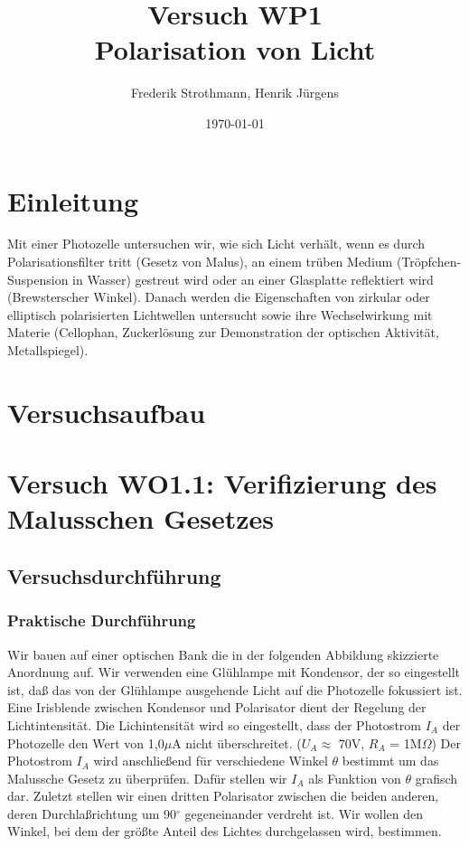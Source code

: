 \documentclass[12pt]{scrartcl}
\title{Versuch WP1\\ Polarisation von Licht}
\author{Frederik Strothmann, Henrik Jürgens}
\date{\today}
\begin{document}

\maketitle
\tableofcontents
\newpage


\section{Einleitung}
Mit einer Photozelle untersuchen wir, wie sich Licht verhält, wenn es durch Polarisationsfilter tritt (Gesetz von Malus), an einem trüben Medium (Tröpfchen-Suspension in Wasser) gestreut wird oder an einer Glasplatte reflektiert wird (Brewsterscher Winkel).
Danach werden die Eigenschaften von zirkular oder elliptisch polarisierten Lichtwellen untersucht sowie ihre Wechselwirkung mit Materie (Cellophan, Zuckerlösung zur Demonstration der optischen Aktivität, Metallspiegel). 


\section{Versuchsaufbau}

\section{Versuch WO1.1: Verifizierung des Malusschen Gesetzes}
\subsection{Versuchsdurchführung}
\subsubsection{Praktische Durchführung}
Wir bauen auf einer optischen Bank die in 
der folgenden Abbildung skizzierte Anordnung auf.
Wir verwenden eine Glühlampe mit Kondensor, der so eingestellt ist, daß das von der Glühlampe ausgehende Licht auf die Photozelle fokussiert ist. Eine Irisblende zwischen Kondensor und Polarisator dient der Regelung der Lichtintensität. Die
Lichintensität wird so eingestellt, dass der Photostrom $I_A$ der Photozelle 
den Wert von 1,0$\mu$A nicht überschreitet. ($U_A \approx$ 70V, $R_A$ = 1M$\Omega$) Der Photostrom $I_A$ wird anschließend für verschiedene Winkel $\theta$ bestimmt um das Malussche Gesetz zu überprüfen.
Dafür stellen wir $I_A$ als Funktion von $\theta$ grafisch dar.
Zuletzt stellen wir einen dritten Polarisator zwischen die beiden anderen, deren Durchlaßrichtung
um 90$^\circ$ gegeneinander verdreht ist. Wir wollen den Winkel, bei dem der größte Anteil des Lichtes durchgelassen wird, bestimmen.
\end{document}
